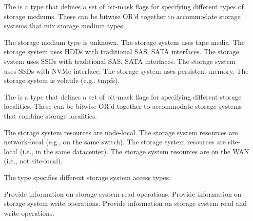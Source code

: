 
The  is a  type that defines a set of bit-mask flags for specifying different types of storage mediums. These can be bitwise OR'd together to accommodate storage systems that mix storage medium types.

\begin{constantdesc}
%
The storage medium type is unknown.
%
The storage system uses tape media.
%
The storage system uses HDDs with traditional SAS, SATA interfaces.
%
The storage system uses SSDs with traditional SAS, SATA interfaces.
%
The storage system uses SSDs with NVMe interface.
%
The storage system uses persistent memory.
%
The storage system is volatile (e.g., tmpfs).
%
\end{constantdesc}


The  is a  type that defines a set of bit-mask flags for specifying different storage localities. These can be bitwise OR'd together to accommodate storage systems that combine storage localities.

\begin{constantdesc}
%
The storage system resources are node-local.
%
The storage system resources are network-local (e.g., on the same switch).
%
The storage system resources are site-local (i.e., in the same datacenter).
%
The storage system resources are on the WAN (i.e., not site-local).
%
\end{constantdesc}


The  type specifies different storage system access types.

\begin{constantdesc}
%
Provide information on storage system read operations.
%
Provide information on storage system write operations.
%
Provide information on storage system read and write operations.
%
\end{constantdesc}


